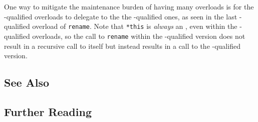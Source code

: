 One way to mitigate the maintenance burden of having many overloads is
for the -qualified overloads to delegate to the the
-qualified ones, as seen in the last
-qualified overload of \lstinline!rename!. Note that
\lstinline!*this! is \emph{always} an , even within the
-qualified overloads, so the call to \lstinline!rename! within
the -qualified version does not result in a recursive call
to itself but instead results in a call to the -qualified
version.

\subsection{See Also}

\hspace{\fill}

\subsection{Further Reading}

\hspace{\fill}
